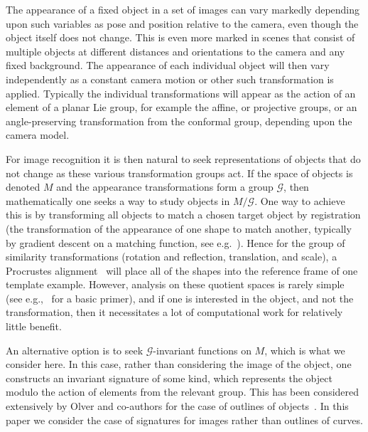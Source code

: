 \documentclass[review,onefignum,onetabnum]{siamonline190516}
\begin{document}
The appearance of a fixed object in a set of images can vary markedly depending upon such variables as pose and position relative to the camera, even though the object itself does not change. This is even more marked in scenes that consist of multiple objects at different distances and orientations to the camera and any fixed background. The appearance of each individual object will then vary independently as a constant camera motion or other such transformation is applied. Typically the individual transformations will appear as the action of an element of a planar Lie group, for example the affine, or projective groups, or an angle-preserving transformation from the conformal group, depending upon the camera model. 

For image recognition it is then natural to seek representations of objects that do not change as these various transformation groups act. If the space of objects is denoted $M$ and the appearance transformations form a group $\mathcal{G}$, then mathematically one seeks a way to study objects in $M / \mathcal{G}$. One way to achieve this is by transforming all objects to match a chosen target object by registration (the transformation of the appearance of one shape to match another, typically by gradient descent on a matching function, see e.g.~\cite{Modersitzki03}). Hence for the group of similarity transformations (rotation and reflection, translation, and scale), a Procrustes alignment~\cite{Kendall1989} will place all of the shapes into the reference frame of one template example. However, analysis on these quotient spaces is rarely simple (see e.g.,~\cite{RiemannianStats} for a basic primer), and if one is interested in the object, and not the transformation, then it necessitates a lot of computational work for relatively little benefit. 

An alternative option is to seek $\mathcal{G}$-invariant functions on $M$, which is what we consider here. In this case, rather than considering the image of the object, one constructs an invariant signature of some kind, which represents the object modulo the action of elements from the relevant group. This has been considered extensively by Olver and co-authors for the case of outlines of objects~\cite{Calabi1998,Hoff2013}. In this paper we consider the case of signatures for images rather than outlines of curves.
\end{document}
